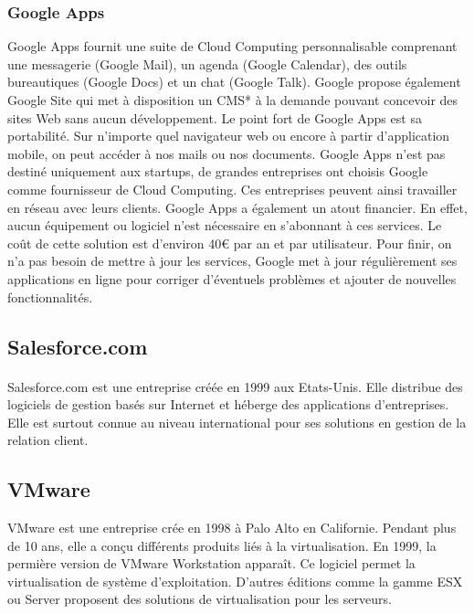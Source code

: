 \documentclass[a4paper,12pt]{report}
\begin{document}
\begin{onehalfspace}
	\subsubsection*{Google Apps}
	Google Apps fournit une suite de Cloud Computing personnalisable comprenant une messagerie (Google Mail), un agenda (Google Calendar), des outils bureautiques (Google Docs) et un chat (Google Talk). Google propose également Google Site qui met à disposition un CMS* à la demande pouvant concevoir des sites Web sans aucun développement.\newline
Le point fort de Google Apps est sa portabilité. Sur n’importe quel navigateur web ou encore à partir d’application mobile, on peut accéder à nos mails ou nos documents. Google Apps n’est pas destiné uniquement aux startups, de grandes entreprises ont choisis Google comme fournisseur de Cloud Computing. Ces entreprises peuvent ainsi travailler en réseau avec leurs clients.\newline
Google Apps a également un atout financier. En effet, aucun équipement ou logiciel n’est nécessaire en s’abonnant à ces services. Le coût de cette solution est d’environ 40\euro{} par an et par utilisateur. Pour finir, on n’a pas besoin de mettre à jour les services, Google met à jour régulièrement ses applications en ligne pour corriger d'éventuels problèmes et ajouter de nouvelles fonctionnalités. %

	\subsection{Salesforce.com}

	\paragraph*{}
	Salesforce.com est une entreprise créée en 1999 aux Etats-Unis. Elle distribue des logiciels de gestion basés sur Internet et héberge des applications d'entreprises. Elle est surtout connue au niveau international pour ses solutions en gestion de la relation client.
	
	\subsection{VMware}
	VMware est une entreprise crée en 1998 à Palo Alto en Californie. Pendant plus de 10 ans, elle a conçu différents produits liés à la virtualisation. En 1999, la permière version de VMware Workstation apparaît. Ce logiciel permet la virtualisation de système d’exploitation. D’autres éditions comme la gamme ESX ou Server proposent des solutions de virtualisation pour les serveurs.


\end{onehalfspace}
\end{document}

